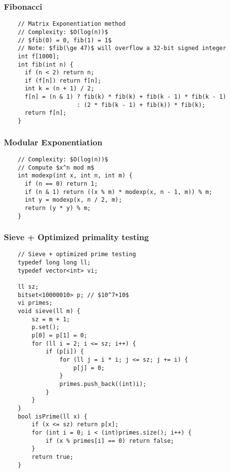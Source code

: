 \documentclass{article}
\begin{document}
\subsubsection{Fibonacci}
\begin{verbatim}
    // Matrix Exponentiation method
    // Complexity: $O(log(n))$
    // $fib(0) = 0, fib(1) = 1$
    // Note: $fib(\ge 47)$ will overflow a 32-bit signed integer
    int f[1000];
    int fib(int n) {
      if (n < 2) return n;
      if (f[n]) return f[n];
      int k = (n + 1) / 2;
      f[n] = (n & 1) ? fib(k) * fib(k) + fib(k - 1) * fib(k - 1)
                     : (2 * fib(k - 1) + fib(k)) * fib(k);
      return f[n];
    }
\end{verbatim}

\subsubsection{Modular Exponentiation}
\begin{verbatim}
    // Complexity: $O(log(n))$
    // Compute $x^n mod m$
    int modexp(int x, int n, int m) {
      if (n == 0) return 1;
      if (n & 1) return ((x % m) * modexp(x, n - 1, m)) % m;
      int y = modexp(x, n / 2, m);
      return (y * y) % m;
    }
\end{verbatim}

\subsubsection{Sieve + Optimized primality testing}
\begin{verbatim}
    // Sieve + optimized prime testing
    typedef long long ll;
    typedef vector<int> vi;

    ll sz;
    bitset<10000010> p; // $10^7+10$
    vi primes;
    void sieve(ll m) {
        sz = m + 1;
        p.set();
        p[0] = p[1] = 0;
        for (ll i = 2; i <= sz; i++) {
            if (p[i]) {
                for (ll j = i * i; j <= sz; j += i) {
                    p[j] = 0;
                }
                primes.push_back((int)i);
            }
        }
    }
    bool isPrime(ll x) {
        if (x <= sz) return p[x];
        for (int i = 0; i < (int)primes.size(); i++) {
            if (x % primes[i] == 0) return false;
        }
        return true;
    }
\end{verbatim}
\end{document}
